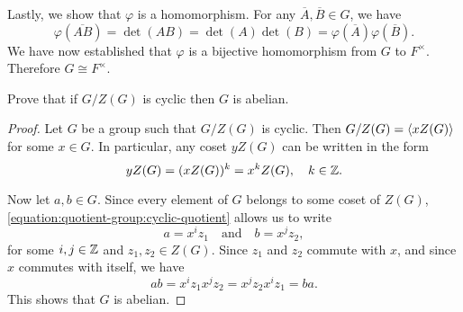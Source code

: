 \begin{solution}
  Lastly, we show that $\varphi$ is a homomorphism. For any
  $\overline{A},\overline{B}\in G$, we have
  \begin{equation*}
    \varphi(\overline{AB})
    = \det(AB)
    = \det(A)\det(B)
    = \varphi(\overline{A})\varphi(\overline{B}).
  \end{equation*}
  We have now established that $\varphi$ is a bijective homomorphism
  from $G$ to $F^\times$. Therefore $G\cong F^\times$.
\end{solution}

\label{exercise:quotient-group:center-quotient-cyclic}
Prove that if $G/Z(G)$ is cyclic then $G$ is abelian.
\begin{proof}
  Let $G$ be a group such that $G/Z(G)$ is cyclic. Then
  $G/Z(G) = \langle{xZ(G)}\rangle$ for some $x\in G$. In particular, any coset
  $yZ(G)$ can be written in the form
  \begin{equation}
    \label{equation:quotient-group:cyclic-quotient}
    yZ(G) = (xZ(G))^k = x^kZ(G),
    \quad k\in\mathbb{Z}.
  \end{equation}

  Now let $a,b\in G$. Since every element of $G$ belongs to some coset
  of $Z(G)$, \eqref{equation:quotient-group:cyclic-quotient} allows us
  to write
  \begin{equation*}
    a = x^iz_1
    \quad\text{and}\quad
    b = x^jz_2,
  \end{equation*}
  for some $i,j\in\mathbb{Z}$ and $z_1,z_2\in Z(G)$. Since $z_1$ and $z_2$
  commute with $x$, and since $x$ commutes with itself, we have
  \begin{equation*}
    ab = x^iz_1x^jz_2 = x^jz_2x^iz_1 = ba.
  \end{equation*}
  This shows that $G$ is abelian.
\end{proof}

